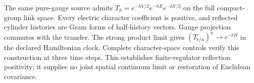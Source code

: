 The same pure-gauge source admits
\(T_h=e^{-hV/2}e^{-hE}e^{-hV/2}\) on the full compact-group link space.
Every electric character coefficient is positive, and reflected cylinder
histories are Gram forms of half-history vectors. Gauge projection
commutes with the transfer. The strong product limit gives
\((T_{t/n})^n\to e^{-tH}\) in the declared Hamiltonian clock.
Complete character-space controls verify this construction at three time
steps. This establishes finite-regulator reflection positivity; it supplies
no joint spatial continuum limit or restoration of Euclidean covariance.
